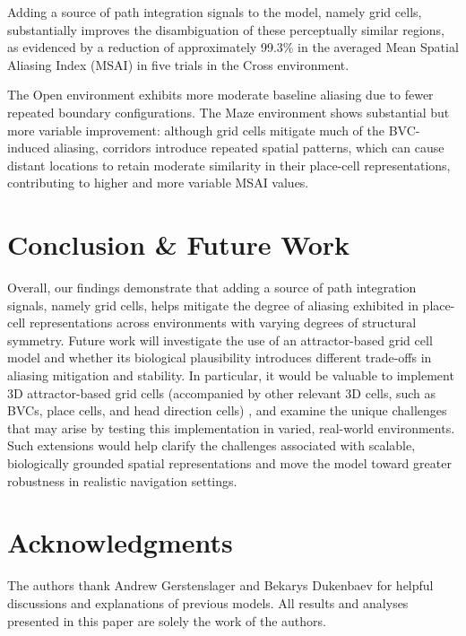 \documentclass[conference]{IEEEtran}
\begin{document}
Adding a source of path integration signals to the model, namely grid cells, substantially improves the disambiguation of these perceptually similar regions, as evidenced by a reduction of approximately 99.3\% in the averaged Mean Spatial Aliasing Index (MSAI) in five trials in the Cross environment. 

The Open environment exhibits more moderate baseline aliasing due to fewer repeated boundary configurations. The Maze environment shows substantial but more variable improvement: although grid cells mitigate much of the BVC-induced aliasing, corridors introduce repeated spatial patterns, which can cause distant locations to retain moderate similarity in their place-cell representations, contributing to higher and more variable MSAI values.

\section{Conclusion \& Future Work}
\label{sec:conclusion}
Overall, our findings demonstrate that adding a source of path integration signals, namely grid cells, helps mitigate the degree of aliasing exhibited in place-cell representations across environments with varying degrees of structural symmetry. Future work will investigate the use of an attractor-based grid cell model and whether its biological plausibility introduces different trade-offs in aliasing mitigation and stability. In particular, it would be valuable to implement 3D attractor-based grid cells (accompanied by other relevant 3D cells, such as BVCs, place cells, and head direction cells) \cite{GerstenslagerDukenbaevMinai2025}, and examine the unique challenges that may arise by testing this implementation in varied, real-world environments. Such extensions would help clarify the challenges associated with scalable, biologically grounded spatial representations and move the model toward greater robustness in realistic navigation settings.


\section*{Acknowledgments}
The authors thank Andrew Gerstenslager and Bekarys Dukenbaev for helpful discussions and explanations of previous models. All results and analyses presented in this paper are solely the work of the authors.

\balance
\end{document}
